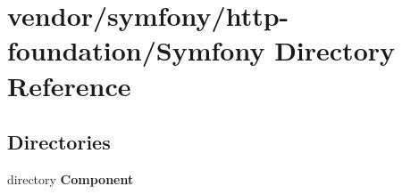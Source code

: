 \section{vendor/symfony/http-\/foundation/\+Symfony Directory Reference}
\label{dir_28c8ed06eb6ca600702b3258888bf048}
\subsection*{Directories}
\begin{DoxyCompactItemize}
\item 
directory {\bf Component}
\end{DoxyCompactItemize}
